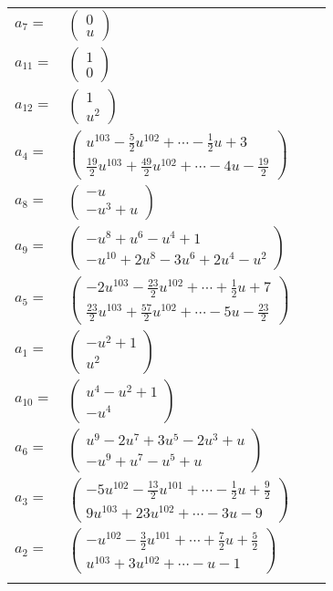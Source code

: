 \documentclass[1p]{elsarticle_modified}
\theoremstyle{definition}
\begin{document}
\begin{tabular}{m{7pt} m{180pt} m{7pt} m{180pt} }
\flushright $a_{7}=$&$\begin{pmatrix}0\\u\end{pmatrix}$ \\
\flushright $a_{11}=$&$\begin{pmatrix}1\\0\end{pmatrix}$ \\
\flushright $a_{12}=$&$\begin{pmatrix}1\\u^2\end{pmatrix}$ \\
\flushright $a_{4}=$&$\begin{pmatrix}u^{103}-\frac{5}{2} u^{102}+\cdots-\frac{1}{2} u+3\\\frac{19}{2} u^{103}+\frac{49}{2} u^{102}+\cdots-4 u-\frac{19}{2}\end{pmatrix}$ \\
\flushright $a_{8}=$&$\begin{pmatrix}- u\\- u^3+u\end{pmatrix}$ \\
\flushright $a_{9}=$&$\begin{pmatrix}- u^8+u^6- u^4+1\\- u^{10}+2 u^8-3 u^6+2 u^4- u^2\end{pmatrix}$ \\
\flushright $a_{5}=$&$\begin{pmatrix}-2 u^{103}-\frac{23}{2} u^{102}+\cdots+\frac{1}{2} u+7\\\frac{23}{2} u^{103}+\frac{57}{2} u^{102}+\cdots-5 u-\frac{23}{2}\end{pmatrix}$ \\
\flushright $a_{1}=$&$\begin{pmatrix}- u^2+1\\u^2\end{pmatrix}$ \\
\flushright $a_{10}=$&$\begin{pmatrix}u^4- u^2+1\\- u^4\end{pmatrix}$ \\
\flushright $a_{6}=$&$\begin{pmatrix}u^9-2 u^7+3 u^5-2 u^3+u\\- u^9+u^7- u^5+u\end{pmatrix}$ \\
\flushright $a_{3}=$&$\begin{pmatrix}-5 u^{102}-\frac{13}{2} u^{101}+\cdots-\frac{1}{2} u+\frac{9}{2}\\9 u^{103}+23 u^{102}+\cdots-3 u-9\end{pmatrix}$ \\
\flushright $a_{2}=$&$\begin{pmatrix}- u^{102}-\frac{3}{2} u^{101}+\cdots+\frac{7}{2} u+\frac{5}{2}\\u^{103}+3 u^{102}+\cdots- u-1\end{pmatrix}$\\&\end{tabular}
\end{document}
